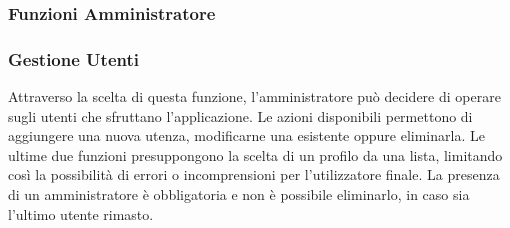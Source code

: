 \documentclass[a4paper,12pt]{beamer}
\begin{document}
\begin{frame}
\frametitle{Funzioni Amministratore}
\begin{center}
\end{center}
\end{frame}

\begin{frame}
\frametitle{Gestione Utenti}
Attraverso la scelta di questa funzione, l'amministratore può decidere di operare sugli utenti che sfruttano l'applicazione. Le azioni disponibili permettono di aggiungere una nuova utenza, modificarne una esistente oppure eliminarla. Le ultime due funzioni presuppongono la scelta di un profilo da una lista, limitando così la possibilità di errori o incomprensioni per l'utilizzatore finale. La presenza di un amministratore è obbligatoria e non è possibile eliminarlo, in caso sia l'ultimo utente rimasto.
\end{frame}
\end{document}
